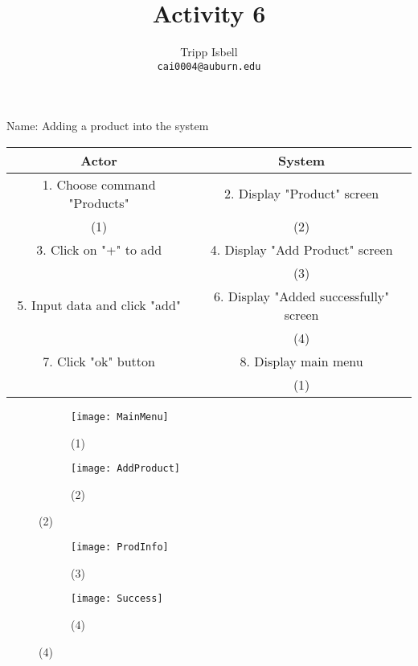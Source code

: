 \documentclass[notitlepage, 11pt]{report}
\title{Activity 6}
\author{Tripp Isbell\\
\texttt{cai0004@auburn.edu}}
\date{}
\begin{document}
\maketitle
Name: Adding a product into the system

\begin{tabular}{| c | c |}
\hline
\textbf{Actor} & \textbf{System}\\ \hline
1. Choose command "Products" & 2. Display "Product" screen\\ 
(1) & (2) \\ \hline
3. Click on "+" to add & 4. Display "Add Product" screen\\
 & (3) \\ \hline
5. Input data and click "add" & 6. Display "Added successfully" screen\\
 & (4) \\ \hline
7. Click "ok" button & 8. Display main menu\\
& (1) \\ \hline
\end{tabular}
\begin{figure}[h]
	\begin{subfigure}{.5\textwidth}
	\centering
	\texttt{[image: MainMenu]}
	\caption{(1)}
	\end{subfigure}%
	\begin{subfigure}{.5\textwidth}
	\centering
	\texttt{[image: AddProduct]}
	\caption{(2)}
	\end{subfigure}
\end{figure}
\begin{figure}
	\begin{subfigure}{.5\textwidth}
	\centering
	\texttt{[image: ProdInfo]}
	\caption{(3)}
	\end{subfigure}%
	\begin{subfigure}{.5\textwidth}
	\centering
	\texttt{[image: Success]}
	\caption{(4)}
	\end{subfigure}
\end{figure}
\end{document}
